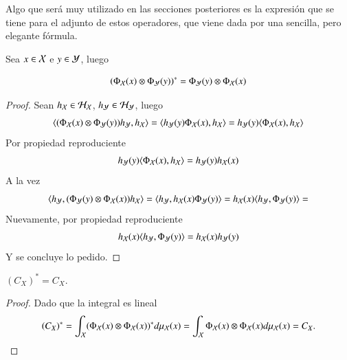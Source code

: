 Algo que será muy utilizado en las secciones posteriores es la expresión que se tiene para el adjunto de estos operadores, que viene dada por una sencilla, pero elegante fórmula.
	\begin{prop}
		Sea $x \in \mathcal{X}$ e $y \in \mathcal{Y}$, luego
		
		\begin{equation*}
			\left ( \Phi_{\mathcal{X}} (x) \otimes \Phi_{\mathcal{Y}} (y) \right )^* = \Phi_{\mathcal{Y}} (y) \otimes \Phi_{\mathcal{X}} (x)
		\end{equation*}
	\end{prop}
	\begin{proof}
		Sean $h_{\mathcal{X}} \in \mathcal{H}_{\mathcal{X}}$, $h_{\mathcal{Y}} \in \mathcal{H}_{\mathcal{Y}}$, luego
		\begin{equation*}
			\langle (\Phi_{\mathcal{X}} (x) \otimes \Phi_{\mathcal{Y}} (y)) h_{\mathcal{Y}}, h_{\mathcal{X}} \rangle = \langle h_{\mathcal{Y}} (y) \Phi_{\mathcal{X}} (x), h_{\mathcal{X}} \rangle = h_{\mathcal{Y}} (y) \langle \Phi_{\mathcal{X}} (x), h_{\mathcal{X}} \rangle
		\end{equation*}
		Por propiedad reproduciente
		\begin{equation*}
			h_{\mathcal{Y}} (y) \langle  \Phi_{\mathcal{X}} (x), h_{\mathcal{X}} \rangle = h_{\mathcal{Y}} (y) h_{\mathcal{X}} (x)
		\end{equation*}
		A la vez
		\begin{equation*}
			\langle h_{\mathcal{Y}}, (\Phi_{\mathcal{Y}} (y) \otimes \Phi_{\mathcal{X}} (x)) h_{\mathcal{X}} \rangle = \langle h_{\mathcal{Y}}, h_{\mathcal{X}} (x) \Phi_{\mathcal{Y}} (y) \rangle = h_{\mathcal{X}} (x) 
			\langle h_{\mathcal{Y}}, \Phi_{\mathcal{Y}} (y) \rangle =
		\end{equation*}
		Nuevamente, por propiedad reproduciente
		\begin{equation*}
			h_{\mathcal{X}} (x) 
			\langle h_{\mathcal{Y}}, \Phi_{\mathcal{Y}} (y) \rangle =h_{\mathcal{X}} (x) h_{\mathcal{Y}} (y) 
		\end{equation*}
		Y se concluye lo pedido.
	\end{proof}
	
	\begin{cor} $(C_{X})^* = C_X$.
        \label{cor:CX_autoad}
	\end{cor}
    \begin{proof}
        Dado que la integral es lineal
	\begin{equation*}
		(C_X)^* = \int_{\mathcal{X}} (\Phi_{\mathcal{X}} (x) \otimes \Phi_{\mathcal{X}} (x))^* d \mu_{\mathcal{X}} (x) = \int_{\mathcal{X}} \Phi_{\mathcal{X}} (x) \otimes \Phi_{\mathcal{X}} (x) d \mu_{\mathcal{X}} (x) = C_X.
	\end{equation*}
    \end{proof}
	
